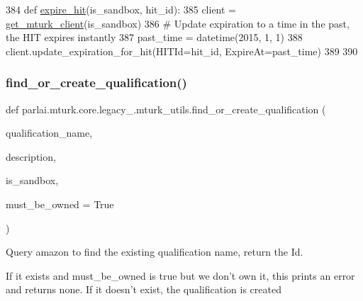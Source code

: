 \begin{DoxyCode}
384 \textcolor{keyword}{def }\hyperlink{namespaceparlai_1_1mturk_1_1core_1_1mturk__utils_a960c8639f5fa43ab8be109eb48ea1925}{expire\_hit}(is\_sandbox, hit\_id):
385     client = \hyperlink{namespaceparlai_1_1mturk_1_1core_1_1mturk__utils_a577e2527c04682284394b0951a090695}{get\_mturk\_client}(is\_sandbox)
386     \textcolor{comment}{# Update expiration to a time in the past, the HIT expires instantly}
387     past\_time = datetime(2015, 1, 1)
388     client.update\_expiration\_for\_hit(HITId=hit\_id, ExpireAt=past\_time)
389 
390 
\end{DoxyCode}
\mbox{\label{namespaceparlai_1_1mturk_1_1core_1_1legacy__2018_1_1mturk__utils_a17d5c7b74fb3c106c48edd07059cca9d}} 
\subsubsection{\texorpdfstring{find\+\_\+or\+\_\+create\+\_\+qualification()}{find\_or\_create\_qualification()}}
{\footnotesize\ttfamily def parlai.\+mturk.\+core.\+legacy\+\_.\+mturk\+\_\+utils.\+find\+\_\+or\+\_\+create\+\_\+qualification (\begin{DoxyParamCaption}\item[{}]{qualification\+\_\+name,  }\item[{}]{description,  }\item[{}]{is\+\_\+sandbox,  }\item[{}]{must\+\_\+be\+\_\+owned = {\ttfamily True} }\end{DoxyParamCaption})}

\begin{DoxyVerb}Query amazon to find the existing qualification name, return the Id.

If it exists and must_be_owned is true but we don't own it, this prints an error and
returns none. If it doesn't exist, the qualification is created
\end{DoxyVerb}
 

